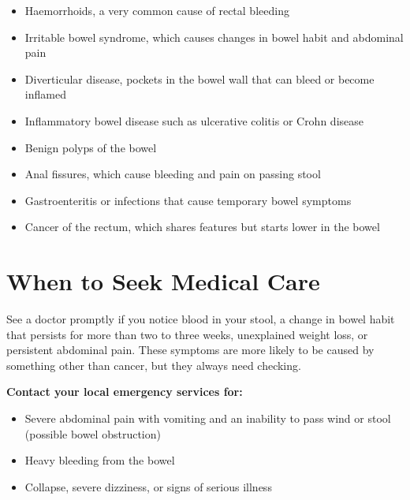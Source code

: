 \begin{itemize}
    \item Haemorrhoids, a very common cause of rectal bleeding
    \item Irritable bowel syndrome, which causes changes in bowel habit and abdominal pain
    \item Diverticular disease, pockets in the bowel wall that can bleed or become inflamed
    \item Inflammatory bowel disease such as ulcerative colitis or Crohn disease
    \item Benign polyps of the bowel
    \item Anal fissures, which cause bleeding and pain on passing stool
    \item Gastroenteritis or infections that cause temporary bowel symptoms
    \item Cancer of the rectum, which shares features but starts lower in the bowel
\end{itemize}

\section*{When to Seek Medical Care}
See a doctor promptly if you notice blood in your stool, a change in bowel habit that persists for more than two to three weeks, unexplained weight loss, or persistent abdominal pain. These symptoms are more likely to be caused by something other than cancer, but they always need checking.

\textbf{Contact your local emergency services for:}
\begin{itemize}
    \item Severe abdominal pain with vomiting and an inability to pass wind or stool (possible bowel obstruction)
    \item Heavy bleeding from the bowel
    \item Collapse, severe dizziness, or signs of serious illness
\end{itemize}

